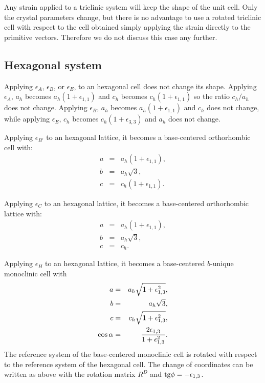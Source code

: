 \documentclass[12pt,a4paper,twoside]{report}
\begin{document}
Any strain applied to a triclinic system will keep the shape of the
unit cell. Only the crystal parameters change, but there is no advantage
to use a rotated triclinic cell with respect to the cell obtained
simply applying the strain directly to the primitive vectors. Therefore
we do not discuss this case any further.

{\color{web-blue}\subsection{Hexagonal system}}
\color{black}

Applying $\epsilon_A$, $\epsilon_B$, or $\epsilon_E$, to an hexagonal cell 
does not change its shape.
Applying $\epsilon_A$, $a_h$ becomes $a_h(1+\epsilon_{1,1})$ and
$c_h$ becomes $c_h(1+\epsilon_{1,1})$ so the ratio $c_h/a_h$ does not
change.
Applying $\epsilon_B$, $a_h$ becomes $a_h(1+\epsilon_{1,1})$ and
$c_h$ does not change, while applying $\epsilon_E$, $c_h$ 
becomes $c_h(1+\epsilon_{3,3})$ and $a_h$ does not change.

Applying $\epsilon_{B'}$ to an hexagonal lattice, it becomes
a base-centered orthorhombic cell with:
\begin{eqnarray}
a&=&a_h (1+\epsilon_{1,1}), \\
b&=&a_h \sqrt{3}, \\
c&=&c_h (1+\epsilon_{1,1}).
\end{eqnarray}

Applying $\epsilon_C$ to an hexagonal lattice, it becomes a base-centered 
orthorhombic lattice with:
\begin{eqnarray}
a&=&a_h (1+\epsilon_{1,1}), \\
b&=&a_h \sqrt{3}, \\
c&=&c_h.
\end{eqnarray}

Applying $\epsilon_H$ to an hexagonal lattice, it becomes a base-centered 
$b$-unique monoclinic cell with
\begin{eqnarray}
a&=&a_h \sqrt{1 + \epsilon_{1,3}^2}, \\
b&=&a_h \sqrt{3}, \\
c&=&c_h \sqrt{1 + \epsilon_{1,3}^2}, \\
\cos\alpha &=& {2 \epsilon_{1,3} \over 1+\epsilon_{1,3}^2}.
\end{eqnarray}
The reference system of the base-centered monoclinic cell is rotated 
with respect to the reference system of the hexagonal cell. 
The change of coordinates can be written as above with the rotation matrix 
$R^D$ and ${\rm tg}\phi=-\epsilon_{1,3}$.
\end{document}
